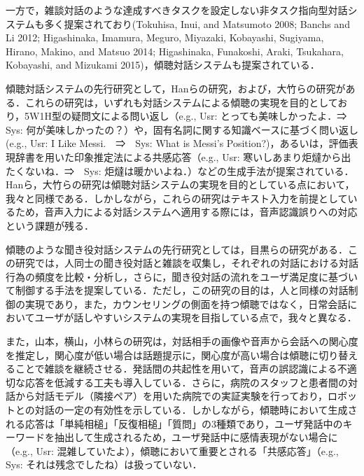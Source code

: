 \documentclass[japanese]{jnlp_1.4}
\begin{document}
一方で，雑談対話のような達成すべきタスクを設定しない非タスク指向型対話システムも多く提案されており(Tokuhisa, Inui, and Matsumoto 2008; Banchs and Li 2012; Higashinaka, \linebreak
Imamura, Meguro, Miyazaki, Kobayashi, Sugiyama, Hirano, Makino, and Matsuo 2014; \linebreak
Higashinaka, Funakoshi, Araki, Tsukahara, Kobayashi, and Mizukami 2015)\nocite{no12,no13,no14,no15}，傾聴対話システムも提案されている．

傾聴対話システムの先行研究として，Hanらの研究\cite{no16,no17}，および，大竹らの研究がある\cite{no18,no19}．これらの研究は，いずれも対話システムによる傾聴の実現を目的としており，5W1H型の疑問文による問い返し（e.g., Usr: とっても美味しかったよ．⇒　Sys: 何が美味しかったの？）や，固有名詞に関する知識ベースに基づく問い返し (e.g., Usr: I Like Messi.　⇒　Sys: What is Messi's Position?)，あるいは，評価表現辞書を用いた印象推定法による共感応答（e.g., Usr: 寒いしあまり炬燵から出たくないね．⇒　Sys: 炬燵は暖かいよね．）などの生成手法が提案されている． Hanら，大竹らの研究は傾聴対話システムの実現を目的としている点において，我々と同様である．しかしながら，これらの研究はテキスト入力を前提としているため，音声入力による対話システムへ適用する際には，音声認識誤りへの対応という課題が残る．

傾聴のような聞き役対話システムの先行研究としては，目黒らの研究がある\cite{no20,no21,no22}．この研究では，人同士の聞き役対話と雑談を収集し，それぞれの対話における対話行為の頻度を比較・分析し，さらに，聞き役対話の流れをユーザ満足度に基づいて制御する手法を提案している．ただし，この研究の目的は，人と同様の対話制御の実現であり，また，カウンセリングの側面を持つ傾聴ではなく，日常会話においてユーザが話しやすいシステムの実現を目指している点で，我々と異なる．

また，山本，横山，小林らの研究\cite{no23,no24,no25,no26,no27}は，対話相手の画像や音声から会話への関心度を推定し，関心度が低い場合は話題提示に，関心度が高い場合は傾聴に切り替えることで雑談を継続させる．発話間の共起性を用いて，音声の誤認識による不適切な応答を低減する工夫も導入している．さらに，病院のスタッフと患者間の対話から対話モデル（隣接ペア）を用いた病院での実証実験を行っており，ロボットとの対話の一定の有効性を示している．しかしながら，傾聴時において生成される応答は「単純相槌」「反復相槌」「質問」の3種類であり，ユーザ発話中のキーワードを抽出して生成されるため，ユーザ発話中に感情表現がない場合に（e.g., Usr: 混雑していたよ），傾聴において重要とされる「共感応答」（e.g., Sys: それは残念でしたね）は扱っていない．
\end{document}
